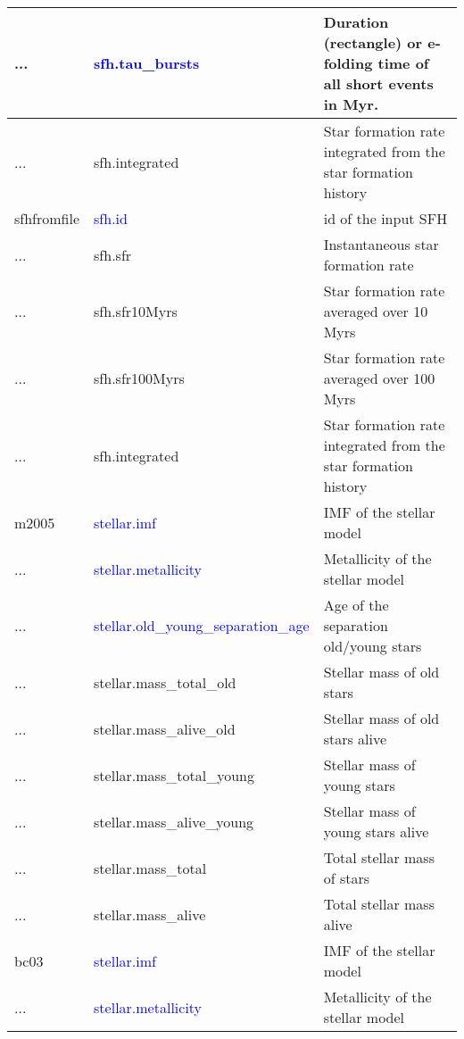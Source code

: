 \begin{longtable}{| p{} | p{} | p{} |}
...         & \textcolor{blue}{sfh.tau\_bursts}   & Duration (rectangle) or e-folding time of all short events in Myr. \\ \hline
...         & sfh.integrated                      & Star formation rate integrated from the star formation history \\ \hline
sfhfromfile & \textcolor{blue}{sfh.id} & id of the input SFH \\ \hline
...         & sfh.sfr                  & Instantaneous star formation rate \\ \hline
...         & sfh.sfr10Myrs            & Star formation rate averaged over 10 Myrs \\ \hline
...         & sfh.sfr100Myrs           & Star formation rate averaged over 100 Myrs \\ \hline
...         & sfh.integrated           & Star formation rate integrated from the star formation history \\ \hline 
m2005       & \textcolor{blue}{stellar.imf}                         & IMF of the stellar model \\ \hline
...         & \textcolor{blue}{stellar.metallicity}                 & Metallicity of the stellar model \\ \hline
...         & \textcolor{blue}{stellar.old\_young\_separation\_age} & Age of the separation old/young stars \\ \hline
...         & stellar.mass\_total\_old                              & Stellar mass of old stars \\ \hline
...         & stellar.mass\_alive\_old                              & Stellar mass of old stars alive \\ \hline
...         & stellar.mass\_total\_young                            & Stellar mass of young stars \\ \hline
...         & stellar.mass\_alive\_young                            & Stellar mass of young stars alive \\ \hline
...         & stellar.mass\_total                                   & Total stellar mass of stars \\ \hline
...         & stellar.mass\_alive                                   & Total stellar mass alive \\ \hline
bc03        & \textcolor{blue}{stellar.imf}                         & IMF of the stellar model \\ \hline
...         & \textcolor{blue}{stellar.metallicity}                 & Metallicity of the stellar model \\ \hline

\end{longtable}
